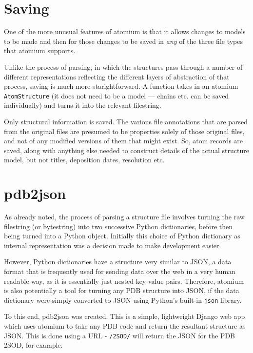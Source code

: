 \section{Saving}

One of the more unusual features of atomium is that it allows changes to models to be made and then for those changes to be saved in \emph{any} of the three file types that atomium supports.

Unlike the process of parsing, in which the structures pass through a number of different representations reflecting the different layers of abstraction of that process, saving is much more starightforward. A function takes in an atomium \texttt{AtomStructure} (it does not need to be a model --- chains etc. can be saved individually) and turns it into the relevant filestring.

Only structural information is saved. The various file annotations that are parsed from the original files are presumed to be properties solely of those original files, and not of any modified versions of them that might exist. So, atom records are saved, along with anything else needed to construct details of the actual structure model, but not titles, deposition dates, resolution etc.

\section{pdb2json}

As already noted, the process of parsing a structure file involves turning the raw filestring (or bytestring) into two successive Python dictionaries, before then being turned into a Python object. Initially this choice of Python dictionary as internal representation was a decision made to make development easier.

However, Python dictionaries have a structure very similar to JSON, a data format that is frequently used for sending data over the web in a very human readable way, as it is essentially just nested key-value pairs. Therefore, atomium is also potentially a tool for turning any PDB structure into JSON, if the data dictionary were simply converted to JSON using Python's built-in \texttt{json} library.

To this end, pdb2json was created. This is a simple, lightweight Django web app which uses atomium to take any PDB code and return the resultant structure as JSON. This is done using a URL - \texttt{/2SOD/} will return the JSON for the PDB 2SOD, for example.

